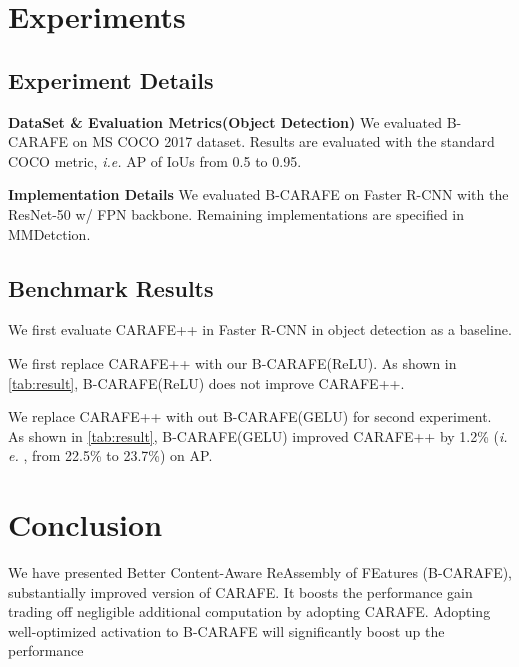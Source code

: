 \documentclass[10pt,twocolumn,letterpaper]{article}
\begin{document}
\section{Experiments}
\label{sec:formatting}
\subsection{Experiment Details}
\noindent
\textbf{DataSet \& Evaluation Metrics(Object Detection)}
We evaluated B-CARAFE on MS COCO 2017 dataset\cite{COCO}. Results are evaluated with the standard COCO metric, {\em i.e.} AP of IoUs from 0.5 to 0.95.

\noindent
\textbf{Implementation Details}
We evaluated B-CARAFE on Faster R-CNN with the ResNet-50\cite{RESNET} w/ FPN\cite{FPN} backbone. Remaining implementations are specified in MMDetction\cite{CARAFEimpl}.

\subsection{Benchmark Results}
We first evaluate CARAFE++ in Faster R-CNN in object detection as a baseline.

We first replace CARAFE++ with our B-CARAFE(ReLU).
As shown in \cref{tab:result}, B-CARAFE(ReLU) does not improve CARAFE++.

We replace CARAFE++ with out B-CARAFE(GELU) for second experiment.
As shown in \cref{tab:result}, B-CARAFE(GELU) improved CARAFE++ by 1.2\% ({\em i. e. }, from 22.5\% to 23.7\%) on AP.

\section{Conclusion}
We have presented Better Content-Aware ReAssembly of FEatures (B-CARAFE), substantially improved version of CARAFE. It boosts the performance gain trading off negligible additional computation by adopting CARAFE. Adopting well-optimized activation to B-CARAFE will significantly boost up the performance


{\small


}
\end{document}
